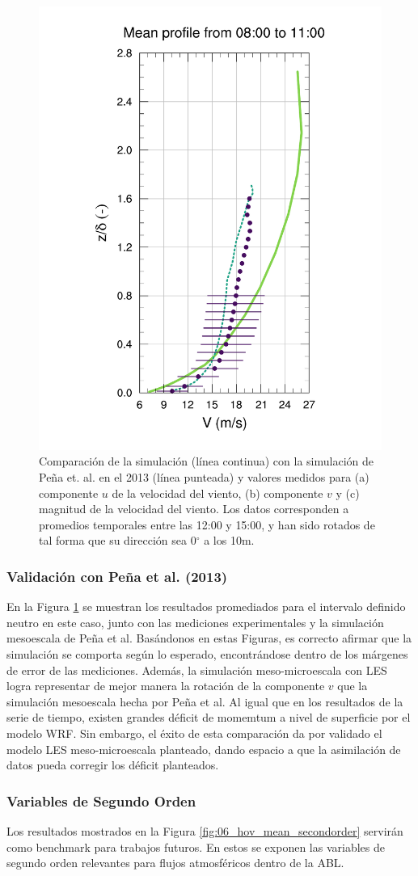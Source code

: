 \begin{figure}[H]
\begin{center}
	\includegraphics[height=0.62\linewidth,page=37,trim={48mm 10mm 41mm 25mm},clip]{Imagenes/06/hov/9V}%
	\end{center}
	\caption{Comparación de la simulación (línea continua) con la simulación de Peña et. al. en el 2013 (línea punteada) y valores medidos para (a) componente $u$ de la velocidad del viento, (b) componente $v$ y (c) magnitud de la velocidad del viento. Los datos corresponden a promedios temporales entre las 12:00 y 15:00, y han sido rotados de tal forma que su dirección sea 0$^\circ$ a los 10m.}
	\label{fig:06_hov_peña}
\end{figure}

\subsubsection{Validación con Peña et al. (2013)}
En la Figura \ref{fig:06_hov_peña} se muestran los resultados promediados para el intervalo definido neutro en este caso, junto con las mediciones experimentales y la simulación mesoescala de Peña et al. Basándonos en estas Figuras, es correcto afirmar que la simulación se comporta según lo esperado, encontrándose dentro de los márgenes de error de las mediciones. Además, la simulación meso-microescala con LES logra representar de mejor manera la rotación de la componente $v$ que la simulación mesoescala hecha por Peña et al. Al igual que en los resultados de la serie de tiempo, existen grandes déficit de momemtum a nivel de superficie por el modelo WRF. Sin embargo, el éxito de esta comparación da por validado el modelo LES meso-microescala planteado, dando espacio a que la asimilación de datos pueda corregir los déficit planteados.
\subsubsection{Variables de Segundo Orden}
Los resultados mostrados en la Figura \ref{fig:06_hov_mean_secondorder} servirán como benchmark para trabajos futuros. En estos se exponen las variables de segundo orden relevantes para flujos atmosféricos dentro de la ABL. 

